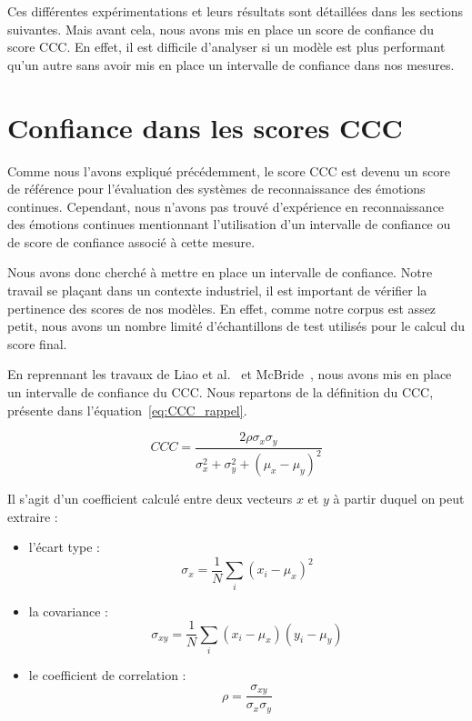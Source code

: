 Ces différentes expérimentations et leurs résultats sont détaillées dans les sections suivantes. Mais avant cela, nous avons mis en place un score de confiance du score CCC. En effet, il est difficile d'analyser si un modèle est plus performant qu'un autre sans avoir mis en place un intervalle de confiance dans nos mesures.

\section{Confiance dans les scores CCC}
Comme nous l'avons expliqué précédemment, le score CCC est devenu un score de référence pour l'évaluation des systèmes de reconnaissance des émotions continues. %
Cependant, nous n'avons pas trouvé d'expérience en reconnaissance des émotions continues  mentionnant l'utilisation d'un intervalle de confiance ou de score de confiance associé à cette mesure.

Nous avons donc cherché à mettre en place un intervalle de confiance. Notre travail se plaçant dans un contexte industriel, il est important de vérifier la pertinence des scores de nos modèles. En effet, comme notre corpus est assez petit, nous avons un nombre limité d'échantillons de test utilisés pour le calcul du score final.

En reprennant les travaux de Liao et al.~\cite{Liao2000} et McBride~\cite{McBride2005}, nous avons mis en place un intervalle de confiance du CCC. Nous repartons de la définition du CCC, présente dans l'équation~\ref{eq:CCC_rappel}.

\begin{equation}
   CCC = \frac{2\rho\sigma_x\sigma_y}{\sigma_x^2 + \sigma_y^2 + (\mu_x - \mu_y)^2}
\label{eq:CCC_rappel}
\end{equation}

Il s'agit d'un coefficient calculé entre deux vecteurs $x$ et $y$ à partir duquel on peut extraire :

\begin{itemize}
  \item l'écart type :
  \begin{equation}
      \sigma_x = \dfrac{1}{N} \sum_{i} \left(x_i - \mu_x\right)^2
  \end{equation}

  \item la covariance :
  \begin{equation}
    \sigma_{xy} = \dfrac{1}{N} \sum_{i} \left(x_i - \mu_x\right)\left(y_i - \mu_y\right)
  \end{equation}

  \item le coefficient de correlation :
  \begin{equation}
    \rho = \dfrac{\sigma_{xy}}{\sigma_{x} \sigma_{y} }
  \end{equation}
\end{itemize}

